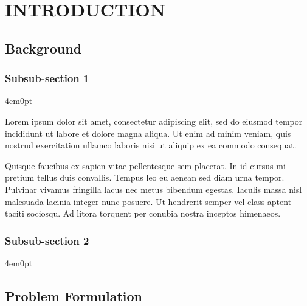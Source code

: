 \setcounter{chapter}{1}
\renewcommand{\thechapter}{\Roman{chapter}}
\chapter[]{INTRODUCTION}
\renewcommand{\thechapter}{\arabic{chapter}}

\begingroup
\fontsize{12pt}{\baselineskip}\selectfont

\section{Background}
	\subsection{Subsub-section 1}
		\begin{indentedblock}{4em}{0pt}
		
			Lorem ipsum dolor sit amet, consectetur adipiscing elit, sed do eiusmod tempor incididunt ut labore et dolore magna aliqua. Ut enim ad minim veniam, quis nostrud exercitation ullamco laboris nisi ut aliquip ex ea commodo consequat. 
			
			
			Quisque faucibus ex sapien vitae pellentesque sem placerat. In id cursus mi pretium tellus duis convallis. Tempus leo eu aenean sed diam urna tempor. Pulvinar vivamus fringilla lacus nec metus bibendum egestas. Iaculis massa nisl malesuada lacinia integer nunc posuere. Ut hendrerit semper vel class aptent taciti sociosqu. Ad litora torquent per conubia nostra inceptos himenaeos.
		\end{indentedblock}
	
	\subsection{Subsub-section 2}
		\begin{indentedblock}{4em}{0pt}
		\end{indentedblock}
	
\section{Problem Formulation}
